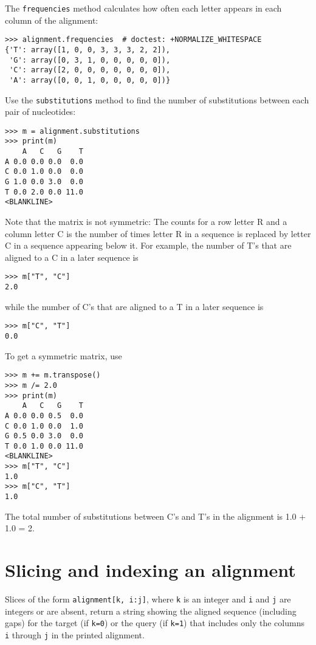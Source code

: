 The \verb+frequencies+ method calculates how often each letter appears in each column of the alignment:
\begin{verbatim}
>>> alignment.frequencies  # doctest: +NORMALIZE_WHITESPACE
{'T': array([1, 0, 0, 3, 3, 3, 2, 2]),
 'G': array([0, 3, 1, 0, 0, 0, 0, 0]),
 'C': array([2, 0, 0, 0, 0, 0, 0, 0]),
 'A': array([0, 0, 1, 0, 0, 0, 0, 0])}
\end{verbatim}
Use the \verb+substitutions+ method to find the number of substitutions between each pair of nucleotides:
\begin{verbatim}
>>> m = alignment.substitutions
>>> print(m)
    A   C   G    T
A 0.0 0.0 0.0  0.0
C 0.0 1.0 0.0  0.0
G 1.0 0.0 3.0  0.0
T 0.0 2.0 0.0 11.0
<BLANKLINE>
\end{verbatim}

Note that the matrix is not symmetric: The counts for a row letter R and a column letter C is the number of times letter R in a sequence is replaced by letter C in a sequence appearing below it. For example, the number of T's that are aligned to a C in a later sequence is
\begin{verbatim}
>>> m["T", "C"]
2.0
\end{verbatim}
while the number of C's that are aligned to a T in a later sequence is
\begin{verbatim}
>>> m["C", "T"]
0.0
\end{verbatim}
To get a symmetric matrix, use
\begin{verbatim}
>>> m += m.transpose()
>>> m /= 2.0
>>> print(m)
    A   C   G    T
A 0.0 0.0 0.5  0.0
C 0.0 1.0 0.0  1.0
G 0.5 0.0 3.0  0.0
T 0.0 1.0 0.0 11.0
<BLANKLINE>
>>> m["T", "C"]
1.0
>>> m["C", "T"]
1.0
\end{verbatim}
The total number of substitutions between C's and T's in the alignment is 1.0 + 1.0 = 2.

\section{Slicing and indexing an alignment}

Slices of the form \verb+alignment[k, i:j]+, where \verb+k+ is an integer and \verb+i+ and \verb+j+ are integers or are absent, return a string showing the aligned sequence (including gaps) for the target (if \verb+k=0+) or the query (if \verb+k=1+) that includes only the columns \verb+i+ through \verb+j+ in the printed alignment.

